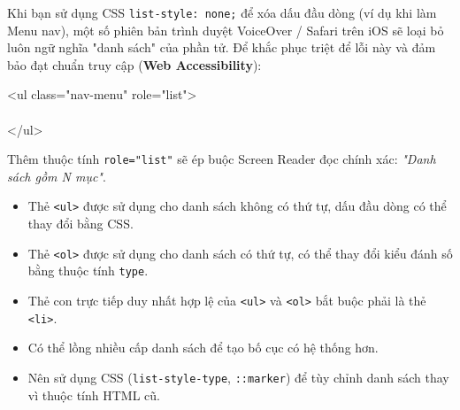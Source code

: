 \documentclass[11pt,oneside]{book}
\newcommand{\codeinline}[1]{\textcolor{accentOrange}{\texttt{#1}}}
\newcommand{\term}[1]{\textbf{\textcolor{primaryBlue}{#1}}}
\begin{document}
\begin{tipBox}
Khi bạn sử dụng CSS \codeinline{list-style: none;} để xóa dấu đầu dòng (ví dụ khi làm Menu nav), một số phiên bản trình duyệt VoiceOver / Safari trên iOS sẽ loại bỏ luôn ngữ nghĩa "danh sách" của phần tử. Để khắc phục triệt để lỗi này và đảm bảo đạt chuẩn truy cập (\term{Web Accessibility}):

\begin{tcolorbox}[
    enhanced,
    colback=white,
    colframe=tipBorder!35,
    boxrule=0.6pt,
    arc=4pt,
    top=5pt, bottom=5pt, left=10pt, right=10pt,
    before=\par\vspace{4pt}, after=\par\vspace{4pt}
]
{\ttfamily\small\color{codeKey}<ul \color{accentOrange}class\color{darkText}=\color{codeString}"nav-menu" \color{accentOrange}role\color{darkText}=\color{codeString}"list"\color{codeKey}>}\\
\\
{\ttfamily\small\color{codeKey}</ul>}
\end{tcolorbox}

Thêm thuộc tính \codeinline{role="list"} sẽ ép buộc Screen Reader đọc chính xác: \textit{"Danh sách gồm N mục"}.
\end{tipBox}

\begin{conceptBox}
\begin{itemize}[leftmargin=1.5em, itemsep=3pt, parsep=0pt]
    \item Thẻ \codeinline{<ul>} được sử dụng cho danh sách không có thứ tự, dấu đầu dòng có thể thay đổi bằng CSS.
    \item Thẻ \codeinline{<ol>} được sử dụng cho danh sách có thứ tự, có thể thay đổi kiểu đánh số bằng thuộc tính \codeinline{type}.
    \item Thẻ con trực tiếp duy nhất hợp lệ của \codeinline{<ul>} và \codeinline{<ol>} bắt buộc phải là thẻ \codeinline{<li>}.
    \item Có thể lồng nhiều cấp danh sách để tạo bố cục có hệ thống hơn.
    \item Nên sử dụng CSS (\codeinline{list-style-type}, \codeinline{::marker}) để tùy chỉnh danh sách thay vì thuộc tính HTML cũ.
\end{itemize}
\end{conceptBox}
\end{document}

